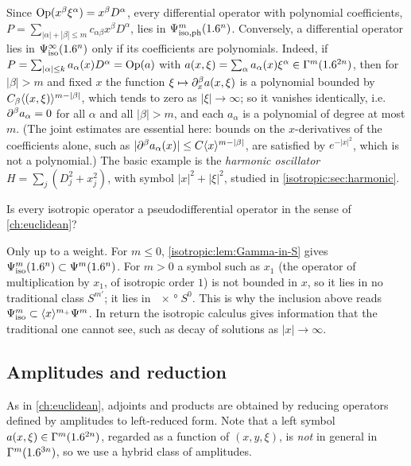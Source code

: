 \begin{example}\label{isotropic:ex:differential}
Since $\operatorname{Op}(x^\beta\xi^\alpha)=x^\beta D^\alpha$, every differential operator
with polynomial coefficients,
$P=\sum_{|\alpha|+|\beta|\le m}c_{\alpha\beta}x^\beta D^\alpha$, lies in
$\Psi^{m}_{\mathrm{iso,ph}}(1.6^n)$. Conversely, a differential operator lies in
$\Psi^{\infty}_{\mathrm{iso}}(1.6^n)$ only if its coefficients are polynomials. Indeed, if
$P=\sum_{|\alpha|\le k}a_\alpha(x)D^\alpha=\operatorname{Op}(a)$ with
$a(x,\xi)=\sum_\alpha a_\alpha(x)\xi^\alpha\in\Gamma^{m}(1.6^{2n})$, then for
$|\beta|>m$ and fixed $x$ the function $\xi\mapsto\partial_x^\beta a(x,\xi)$ is a
polynomial bounded by $C_\beta\langle (x,\xi)\rangle^{m-|\beta|}$, which tends to zero as
$|\xi|\to\infty$; so it vanishes identically, i.e.\ $\partial^\beta a_\alpha=0$ for
all $\alpha$ and all $|\beta|>m$, and each $a_\alpha$ is a polynomial of degree
at most $m$. (The joint estimates are essential here: bounds on the
$x$-derivatives of the coefficients alone, such as
$|\partial^\beta a_\alpha(x)|\le C\langle x\rangle^{m-|\beta|}$, are satisfied by
$e^{-|x|^2}$, which is not a polynomial.) The basic example is the \emph{harmonic oscillator}
$H=\sum_j(D_j^2+x_j^2)$, with symbol $|x|^2+|\xi|^2$, studied in
\cref{isotropic:sec:harmonic}.
\end{example}

\begin{question}
Is every isotropic operator a pseudodifferential operator in the sense of
\cref{ch:euclidean}?
\end{question}
\begin{answer}
Only up to a weight. For $m\le0$, \cref{isotropic:lem:Gamma-in-S} gives
$\Psi^{m}_{\mathrm{iso}}(1.6^n)\subset\Psi^{m}(1.6^n)$. For $m>0$ a symbol such as $x_1$
(the operator of multiplication by $x_1$, of isotropic order $1$) is not
bounded in $x$, so it lies in no traditional class $S^{m'}$; it lies in
$\ang{x}S^0$. This is why the inclusion above reads
$\Psi^{m}_{\mathrm{iso}}\subset\langle x\rangle^{m_+}\Psi^{m}$. In return the isotropic calculus
gives information that the traditional one cannot see, such as decay of
solutions as $|x|\to\infty$.
\end{answer}

\subsection{Amplitudes and reduction}

As in \cref{ch:euclidean}, adjoints and products are obtained by reducing
operators defined by amplitudes to left-reduced form. Note that a left symbol
$a(x,\xi)\in\Gamma^{m}(1.6^{2n})$, regarded as a function of $(x,y,\xi)$, is
\emph{not} in general in $\Gamma^{m}(1.6^{3n})$, so we use a hybrid class of
amplitudes.

